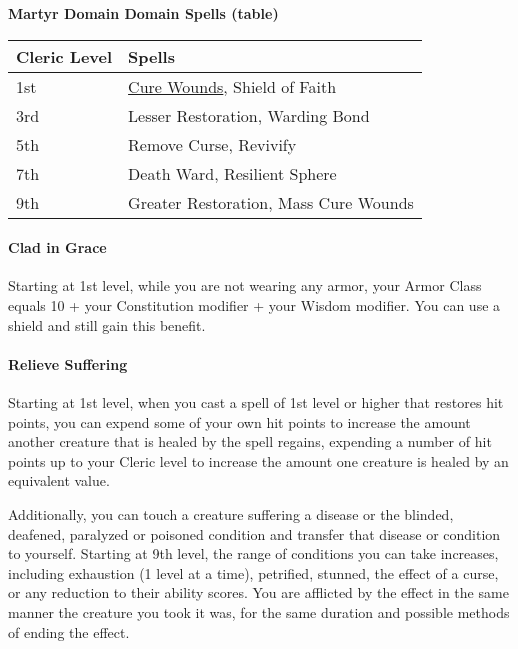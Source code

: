 \textbf{Martyr Domain Domain Spells (table)}

\begin{longtable}[]{@{}
  >{\raggedright\arraybackslash}p{}
  >{\raggedright\arraybackslash}p{}@{}}
\toprule\noalign{}
\begin{minipage}[b]{\linewidth}\raggedright
Cleric Level
\end{minipage} & \begin{minipage}[b]{\linewidth}\raggedright
Spells
\end{minipage} \\
\midrule\noalign{}
\endhead
\bottomrule\noalign{}
\endlastfoot
1st & \hyperref[Spell_Cure_Wounds_cure-wounds]{Cure Wounds}, Shield of
Faith \\
3rd & Lesser Restoration, Warding Bond \\
5th & Remove Curse, Revivify \\
7th & Death Ward, Resilient Sphere \\
9th & Greater Restoration, Mass Cure Wounds \\
\end{longtable}

\paragraph{Clad in Grace}\label{Martyr_Domain_clad-in-grace}

Starting at 1st level, while you are not wearing any armor, your Armor
Class equals 10 + your Constitution modifier + your Wisdom modifier. You
can use a shield and still gain this benefit.

\paragraph{Relieve Suffering}\label{Martyr_Domain_relieve-suffering}

Starting at 1st level, when you cast a spell of 1st level or higher that
restores hit points, you can expend some of your own hit points to
increase the amount another creature that is healed by the spell
regains, expending a number of hit points up to your Cleric level to
increase the amount one creature is healed by an equivalent value.

Additionally, you can touch a creature suffering a disease or the
blinded, deafened, paralyzed or poisoned condition and transfer that
disease or condition to yourself. Starting at 9th level, the range of
conditions you can take increases, including exhaustion (1 level at a
time), petrified, stunned, the effect of a curse, or any reduction to
their ability scores. You are afflicted by the effect in the same manner
the creature you took it was, for the same duration and possible methods
of ending the effect.

